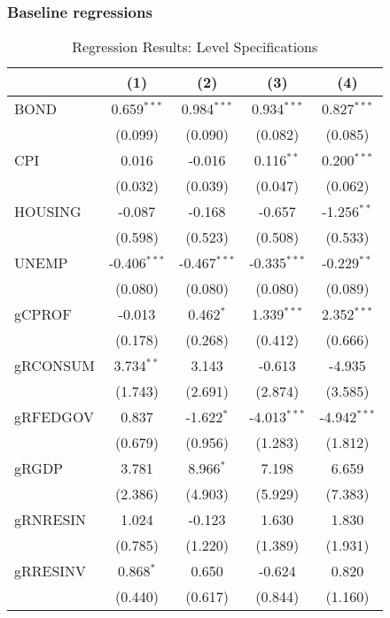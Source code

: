 \subsubsection{Baseline regressions}
\begin{table}[H]
\centering
\caption{Regression Results: Level Specifications}
\begin{tabular}{@{\extracolsep{5pt}}lcccc}
\hline
\hline
& (1) & (2) & (3) & (4) \\
\hline
BOND & 0.659$^{***}$ & 0.984$^{***}$ & 0.934$^{***}$ & 0.827$^{***}$ \\
     & (0.099) & (0.090) & (0.082) & (0.085) \\

CPI  & 0.016 & -0.016 & 0.116$^{**}$ & 0.200$^{***}$ \\
     & (0.032) & (0.039) & (0.047) & (0.062) \\

HOUSING & -0.087 & -0.168 & -0.657 & -1.256$^{**}$ \\
        & (0.598) & (0.523) & (0.508) & (0.533) \\

UNEMP & -0.406$^{***}$ & -0.467$^{***}$ & -0.335$^{***}$ & -0.229$^{**}$ \\
      & (0.080) & (0.080) & (0.080) & (0.089) \\

gCPROF & -0.013 & 0.462$^{*}$ & 1.339$^{***}$ & 2.352$^{***}$ \\
       & (0.178) & (0.268) & (0.412) & (0.666) \\

gRCONSUM & 3.734$^{**}$ & 3.143 & -0.613 & -4.935 \\
         & (1.743) & (2.691) & (2.874) & (3.585) \\

gRFEDGOV & 0.837 & -1.622$^{*}$ & -4.013$^{***}$ & -4.942$^{***}$ \\
         & (0.679) & (0.956) & (1.283) & (1.812) \\

gRGDP & 3.781 & 8.966$^{*}$ & 7.198 & 6.659 \\
      & (2.386) & (4.903) & (5.929) & (7.383) \\

gRNRESIN & 1.024 & -0.123 & 1.630 & 1.830 \\
         & (0.785) & (1.220) & (1.389) & (1.931) \\

gRRESINV & 0.868$^{*}$ & 0.650 & -0.624 & 0.820 \\
         & (0.440) & (0.617) & (0.844) & (1.160) \\


\end{tabular}
\end{table}
